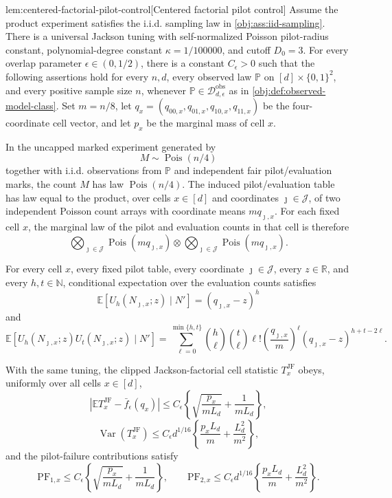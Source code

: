 \documentclass[11pt]{article}
\begin{document}
\begin{lemmav}{lem:centered-factorial-pilot-control}[Centered factorial pilot control]
Assume the product experiment satisfies the i.i.d. sampling law in \cref{obj:ass:iid-sampling}.  There is a universal Jackson tuning with self-normalized Poisson pilot-radius constant, polynomial-degree constant \(\kappa=1/100000\), and cutoff \(D_0=3\).  For every overlap parameter \(\epsilon\in(0,1/2)\), there is a constant \(C_\epsilon>0\) such that the following assertions hold for every \(n,d\), every observed law \(\mathbb P\) on \([d]\times\{0,1\}^2\), and every positive sample size \(n\), whenever \(\mathbb P\in\mathcal D_{d,\epsilon}^{\mathrm{obs}}\) as in \cref{obj:def:observed-model-class}.  Set \(m=n/8\), let \(q_x=(q_{00,x},q_{01,x},q_{10,x},q_{11,x})\) be the four-coordinate cell vector, and let \(p_x\) be the marginal mass of cell \(x\).

In the uncapped marked experiment generated by
\[
M\sim \operatorname{Pois}(n/4)
\]
together with i.i.d. observations from \(\mathbb P\) and independent fair pilot/evaluation marks, the count \(M\) has law \(\operatorname{Pois}(n/4)\).  The induced pilot/evaluation table has law equal to the product, over cells \(x\in[d]\) and coordinates \(\jmath\in\mathcal J\), of two independent Poisson count arrays with coordinate means \(m q_{\jmath,x}\).  For each fixed cell \(x\), the marginal law of the pilot and evaluation counts in that cell is therefore
\[
\bigotimes_{\jmath\in\mathcal J}\operatorname{Pois}(m q_{\jmath,x})
\otimes
\bigotimes_{\jmath\in\mathcal J}\operatorname{Pois}(m q_{\jmath,x}).
\]

For every cell \(x\), every fixed pilot table, every coordinate \(\jmath\in\mathcal J\), every \(z\in\mathbb R\), and every \(h,t\in\mathbb N\), conditional expectation over the evaluation counts satisfies
\[
\mathbb E\!\left[U_h(N_{\jmath,x};z)\mid N'\right]
=
(q_{\jmath,x}-z)^h
\]
and
\[
\mathbb E\!\left[U_h(N_{\jmath,x};z)U_t(N_{\jmath,x};z)\mid N'\right]
=
\sum_{\ell=0}^{\min\{h,t\}}
\binom{h}{\ell}\binom{t}{\ell}\ell!
\left(\frac{q_{\jmath,x}}{m}\right)^\ell
(q_{\jmath,x}-z)^{h+t-2\ell}.
\]

With the same tuning, the clipped Jackson-factorial cell statistic \(T_x^{\mathrm{JF}}\) obeys, uniformly over all cells \(x\in[d]\),
\[
\left|
\mathbb E T_x^{\mathrm{JF}}-\bar f_\epsilon(q_x)
\right|
\le
C_\epsilon
\left\{
\sqrt{\frac{p_x}{mL_d}}+\frac{1}{mL_d}
\right\},
\]
\[
\operatorname{Var}(T_x^{\mathrm{JF}})
\le
C_\epsilon d^{1/16}
\left\{
\frac{p_x L_d}{m}+\frac{L_d^2}{m^2}
\right\},
\]
and the pilot-failure contributions satisfy
\[
\mathrm{PF}_{1,x}
\le
C_\epsilon
\left\{
\sqrt{\frac{p_x}{mL_d}}+\frac{1}{mL_d}
\right\},
\qquad
\mathrm{PF}_{2,x}
\le
C_\epsilon d^{1/16}
\left\{
\frac{p_x L_d}{m}+\frac{L_d^2}{m^2}
\right\}.
\]
\end{lemmav}
\end{document}
